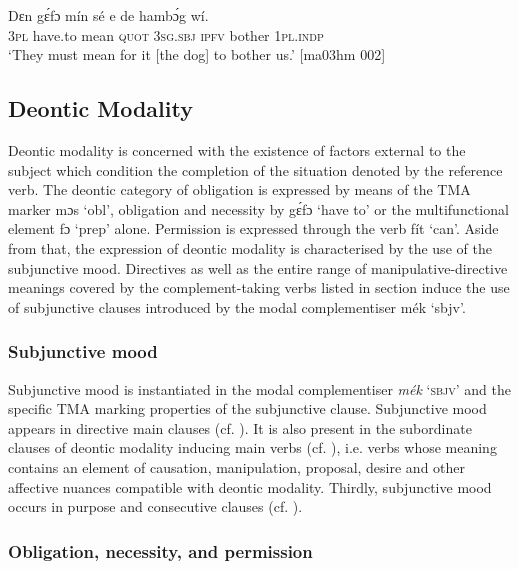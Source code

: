 \ea%
    \label{ex:key:413}
    \gll Dɛn  gɛ́fɔ    mín    sé    e    de  hambɔ́g  wí.\\
\textsc{3pl}  have.to  mean  \textsc{quot}    \textsc{3sg.sbj}  \textsc{ipfv}  bother  \textsc{1pl.indp}\\

\glt ‘They must mean for it [the dog] to bother us.’ [ma03hm 002]
\z

\subsection{Deontic Modality} 

Deontic modality is concerned with the existence of factors external to the subject which condition the completion of the situation denoted by the reference verb. The deontic category of obligation is expressed by means of the TMA marker mɔs ‘obl’, obligation and necessity by gɛ́fɔ ‘have to’ or the multifunctional element fɔ ‘prep’ alone. Permission is expressed through the verb fít ‘can’. Aside from that, the expression of deontic modality is characterised by the use of the subjunctive mood. Directives{\fff} as well as the entire range of manipulative-directive meanings covered by the complement-taking verbs listed in section  induce the use of subjunctive clauses introduced by the modal complementiser mék ‘sbjv’. 

\subsubsection{Subjunctive mood}\label{sec:6.7.3.1}

Subjunctive mood is instantiated in the modal complementiser \textit{mék} ‘\textsc{sbjv}’ and the specific TMA marking properties of the subjunctive clause. Subjunctive mood appears in directive main clauses (cf. ). It is also present in the subordinate clauses of deontic modality inducing main verbs (cf. ), i.e. verbs whose meaning contains an element of causation, manipulation, proposal, desire and other affective nuances compatible with deontic modality. Thirdly, subjunctive mood occurs in purpose and consecutive clauses (cf. ).

\subsubsection{Obligation, necessity, and permission}\label{sec:6.7.3.2}


